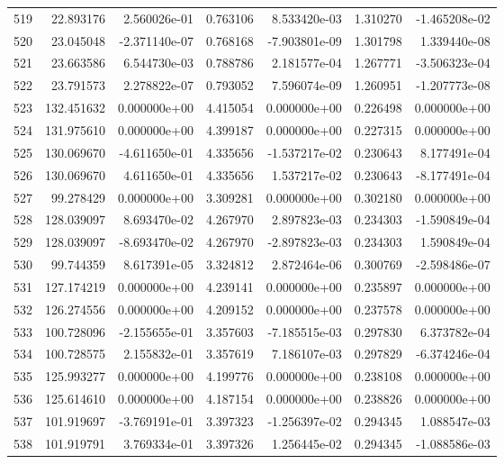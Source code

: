 \begin{tabular}{rrrrrrr}
 519 &  22.893176 &  2.560026e-01 &  0.763106 &  8.533420e-03 &    1.310270 & -1.465208e-02 \\
 520 &  23.045048 & -2.371140e-07 &  0.768168 & -7.903801e-09 &    1.301798 &  1.339440e-08 \\
 521 &  23.663586 &  6.544730e-03 &  0.788786 &  2.181577e-04 &    1.267771 & -3.506323e-04 \\
 522 &  23.791573 &  2.278822e-07 &  0.793052 &  7.596074e-09 &    1.260951 & -1.207773e-08 \\
 523 & 132.451632 &  0.000000e+00 &  4.415054 &  0.000000e+00 &    0.226498 &  0.000000e+00 \\
 524 & 131.975610 &  0.000000e+00 &  4.399187 &  0.000000e+00 &    0.227315 &  0.000000e+00 \\
 525 & 130.069670 & -4.611650e-01 &  4.335656 & -1.537217e-02 &    0.230643 &  8.177491e-04 \\
 526 & 130.069670 &  4.611650e-01 &  4.335656 &  1.537217e-02 &    0.230643 & -8.177491e-04 \\
 527 &  99.278429 &  0.000000e+00 &  3.309281 &  0.000000e+00 &    0.302180 &  0.000000e+00 \\
 528 & 128.039097 &  8.693470e-02 &  4.267970 &  2.897823e-03 &    0.234303 & -1.590849e-04 \\
 529 & 128.039097 & -8.693470e-02 &  4.267970 & -2.897823e-03 &    0.234303 &  1.590849e-04 \\
 530 &  99.744359 &  8.617391e-05 &  3.324812 &  2.872464e-06 &    0.300769 & -2.598486e-07 \\
 531 & 127.174219 &  0.000000e+00 &  4.239141 &  0.000000e+00 &    0.235897 &  0.000000e+00 \\
 532 & 126.274556 &  0.000000e+00 &  4.209152 &  0.000000e+00 &    0.237578 &  0.000000e+00 \\
 533 & 100.728096 & -2.155655e-01 &  3.357603 & -7.185515e-03 &    0.297830 &  6.373782e-04 \\
 534 & 100.728575 &  2.155832e-01 &  3.357619 &  7.186107e-03 &    0.297829 & -6.374246e-04 \\
 535 & 125.993277 &  0.000000e+00 &  4.199776 &  0.000000e+00 &    0.238108 &  0.000000e+00 \\
 536 & 125.614610 &  0.000000e+00 &  4.187154 &  0.000000e+00 &    0.238826 &  0.000000e+00 \\
 537 & 101.919697 & -3.769191e-01 &  3.397323 & -1.256397e-02 &    0.294345 &  1.088547e-03 \\
 538 & 101.919791 &  3.769334e-01 &  3.397326 &  1.256445e-02 &    0.294345 & -1.088586e-03 \\

\end{tabular}
